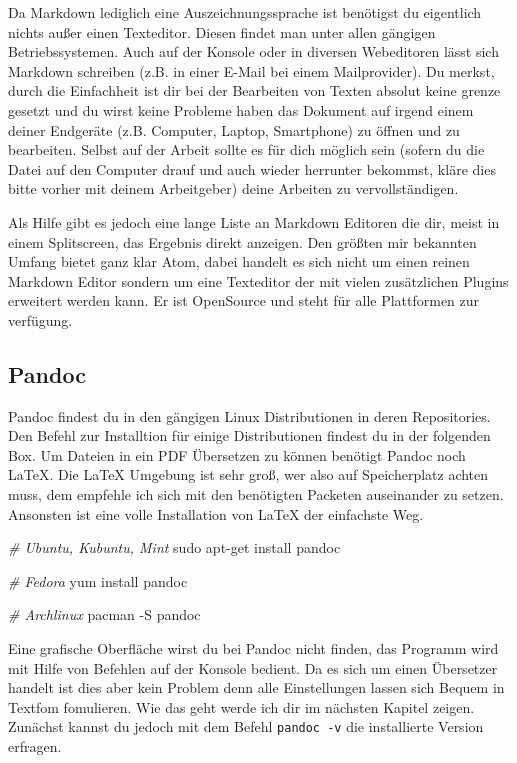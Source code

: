 \documentclass[
    12pt,
    a4paper,
            ngerman,
        bibliography=totocnumbered,
    listof=totocnumbered
]{scrartcl}
\newenvironment{Shaded}{}{}
\newcommand{\AttributeTok}[1]{\textcolor[rgb]{0.49,0.56,0.16}{#1}}
\newcommand{\CommentTok}[1]{\textcolor[rgb]{0.38,0.63,0.69}{\textit{#1}}}
\newcommand{\ExtensionTok}[1]{#1}
\newcommand{\FunctionTok}[1]{\textcolor[rgb]{0.02,0.16,0.49}{#1}}
\newcommand{\NormalTok}[1]{#1}
\begin{document}
Da Markdown lediglich eine Auszeichnungssprache ist benötigst du
eigentlich nichts außer einen Texteditor. Diesen findet man unter allen
gängigen Betriebssystemen. Auch auf der Konsole oder in diversen
Webeditoren lässt sich Markdown schreiben (z.B. in einer E-Mail bei
einem Mailprovider). Du merkst, durch die Einfachheit ist dir bei der
Bearbeiten von Texten absolut keine grenze gesetzt und du wirst keine
Probleme haben das Dokument auf irgend einem deiner Endgeräte (z.B.
Computer, Laptop, Smartphone) zu öffnen und zu bearbeiten. Selbst auf
der Arbeit sollte es für dich möglich sein (sofern du die Datei auf den
Computer drauf und auch wieder herrunter bekommst, kläre dies bitte
vorher mit deinem Arbeitgeber) deine Arbeiten zu vervollständigen.

Als Hilfe gibt es jedoch eine lange Liste an Markdown Editoren die dir,
meist in einem Splitscreen, das Ergebnis direkt anzeigen. Den größten
mir bekannten Umfang bietet ganz klar Atom, dabei handelt es sich nicht
um einen reinen Markdown Editor sondern um eine Texteditor der mit
vielen zusätzlichen Plugins erweitert werden kann. Er ist OpenSource und
steht für alle Plattformen zur verfügung.

\hypertarget{pandoc}{%
\subsection{Pandoc}\label{pandoc}}

Pandoc findest du in den gängigen Linux Distributionen in deren
Repositories. Den Befehl zur Installtion für einige Distributionen
findest du in der folgenden Box. Um Dateien in ein PDF Übersetzen zu
können benötigt Pandoc noch LaTeX. Die LaTeX Umgebung ist sehr groß, wer
also auf Speicherplatz achten muss, dem empfehle ich sich mit den
benötigten Packeten auseinander zu setzen. Ansonsten ist eine volle
Installation von LaTeX der einfachste Weg.

\begin{Shaded}
\begin{Highlighting}[]
\CommentTok{\# Ubuntu, Kubuntu, Mint}
\FunctionTok{sudo}\NormalTok{ apt{-}get install pandoc}

\CommentTok{\# Fedora}
\ExtensionTok{yum}\NormalTok{ install pandoc}

\CommentTok{\# Archlinux}
\ExtensionTok{pacman} \AttributeTok{{-}S}\NormalTok{ pandoc}
\end{Highlighting}
\end{Shaded}

Eine grafische Oberfläche wirst du bei Pandoc nicht finden, das Programm
wird mit Hilfe von Befehlen auf der Konsole bedient. Da es sich um einen
Übersetzer handelt ist dies aber kein Problem denn alle Einstellungen
lassen sich Bequem in Textfom fomulieren. Wie das geht werde ich dir im
nächsten Kapitel zeigen. Zunächst kannst du jedoch mit dem Befehl
\texttt{pandoc\ -v} die installierte Version erfragen.
\end{document}
